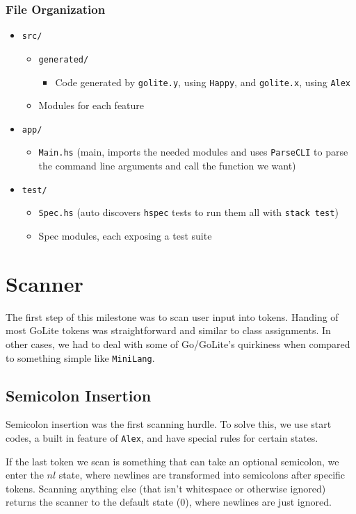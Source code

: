 \documentclass[11pt]{article}
\begin{document}
\subsubsection{File Organization}
\label{sec:orgb7ecf58}
\begin{itemize}
\item \texttt{src/}
\begin{itemize}
\item \texttt{generated/}
\begin{itemize}
\item Code generated by \texttt{golite.y}, using \texttt{Happy}, and \texttt{golite.x}, using \texttt{Alex}
\end{itemize}
\item Modules for each feature
\end{itemize}
\item \texttt{app/}
\begin{itemize}
\item \texttt{Main.hs} (main, imports the needed modules and uses
\texttt{ParseCLI} to parse the command line arguments and call the
function we want)
\end{itemize}
\item \texttt{test/}
\begin{itemize}
\item \texttt{Spec.hs} (auto discovers \texttt{hspec} tests to run them all with
\texttt{stack test})
\item Spec modules, each exposing a test suite
\end{itemize}
\end{itemize}
\section{Scanner}
\label{sec:org82329f8}
The first step of this milestone was to scan user input into
tokens. Handing of most GoLite tokens was straightforward and
similar to class assignments. In other cases, we had to deal with
some of Go/GoLite's quirkiness when compared to something simple
like \texttt{MiniLang}.
\subsection{Semicolon Insertion}
\label{sec:org072a17d}
Semicolon insertion was the first scanning hurdle. To solve
this, we use start codes, a built in feature of \texttt{Alex}, and have
special rules for certain states.

If the last token we scan is something that can take an optional
semicolon, we enter the \(nl\) state, where newlines are transformed into
semicolons after specific tokens. Scanning anything else (that isn't
whitespace or otherwise ignored) returns the scanner to the default
state (\(0\)), where newlines are just ignored.
\end{document}
